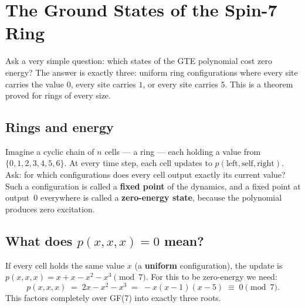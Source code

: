 \documentclass[11pt,a4paper]{article}
\newcommand{\term}[1]{\textbf{#1}}
\begin{document}
\section{The Ground States of the Spin-7 Ring}
\label{sec:ground}

\begin{tcolorbox}[colback=boxblue,colframe=blue!40!black,title=Key idea]
Ask a very simple question: which states of the GTE polynomial cost zero
energy?  The answer is exactly three: uniform ring configurations where
every site carries the value $0$, every site carries $1$, or every site
carries $5$.  This is a theorem proved for rings of every size.
\end{tcolorbox}

\subsection{Rings and energy}

Imagine a cyclic chain of $n$ cells --- a ring --- each holding a value
from $\{0,1,2,3,4,5,6\}$.  At every time step, each cell updates to
$p(\text{left}, \text{self}, \text{right})$.  Ask: for which configurations
does every cell output exactly its current value?  Such a configuration is
called a \term{fixed point} of the dynamics, and a fixed point at output~$0$
everywhere is called a \term{zero-energy state}, because the polynomial
produces zero excitation.

\subsection{What does $p(x,x,x) = 0$ mean?}

If every cell holds the same value $x$ (a \term{uniform} configuration),
the update is $p(x,x,x) = x + x - x^2 - x^3 \pmod 7$.  For this to be
zero-energy we need:
\begin{equation}
  p(x,x,x) \;=\; 2x - x^2 - x^3 \;=\; -x(x-1)(x-5) \;\equiv\; 0
  \pmod{7}.
  \label{eq:ground}
\end{equation}
This factors completely over GF(7) into exactly three roots.
\end{document}
